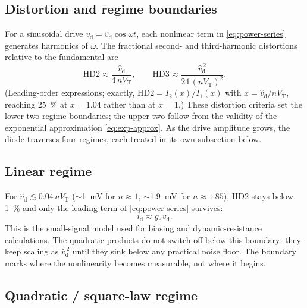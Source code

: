 \documentclass[12pt]{article}
\newcommand{\VT}{V_{\mathrm{T}}}
\newcommand{\vd}{v_{\mathrm{d}}}
\newcommand{\id}{i_{\mathrm{d}}}
\newcommand{\gd}{g_{\mathrm{d}}}
\newcommand{\vhd}{\hat{v}_{\mathrm{d}}}
\begin{document}
\subsection*{Distortion and regime boundaries}

For a sinusoidal drive $\vd = \vhd \cos\omega t$, each nonlinear term in \eqref{eq:power-series} generates harmonics of $\omega$. The fractional second- and third-harmonic distortions relative to the fundamental are
\begin{equation}
\mathrm{HD2} \approx \frac{\vhd}{4\, n \VT}, \qquad
\mathrm{HD3} \approx \frac{\vhd^{\,2}}{24\,(n \VT)^2}.
\end{equation}
(Leading-order expressions; exactly, $\mathrm{HD2} = I_2(x)/I_1(x)$ with $x = \vhd/n\VT$, reaching \SI{25}{\percent} at $x = 1.04$ rather than at $x = 1$.) These distortion criteria set the lower two regime boundaries; the upper two follow from the validity of the exponential approximation \eqref{eq:exp-approx}. As the drive amplitude grows, the diode traverses four regimes, each treated in its own subsection below.

\subsection*{Linear regime}

For $\vhd \lesssim 0.04\, n\VT$ ($\sim$\SI{1}{\milli\volt} for $n \approx 1$, $\sim$\SI{1.9}{\milli\volt} for $n \approx 1.85$), HD2 stays below \SI{1}{\percent} and only the leading term of \eqref{eq:power-series} survives:
\begin{equation}
\id \approx \gd \vd.
\label{eq:linear}
\end{equation}
This is the small-signal model used for biasing and dynamic-resistance calculations. The quadratic products do not switch off below this boundary; they keep scaling as $\vhd^{\,2}$ until they sink below any practical noise floor. The boundary marks where the nonlinearity becomes measurable, not where it begins.

\subsection*{Quadratic / square-law regime}
\end{document}
